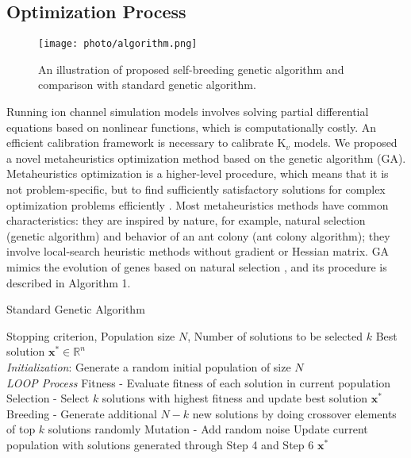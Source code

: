 \documentclass[journal]{IEEEtran}
\begin{document}
\subsection{Optimization Process}
\begin{figure}
    \label{fig5}
    \centering
    \texttt{[image: photo/algorithm.png]}
    \caption{An illustration of proposed self-breeding genetic algorithm and comparison with standard genetic algorithm.}
\end{figure}
Running ion channel simulation models involves solving partial differential equations based on nonlinear functions, which is computationally costly. An efficient calibration framework is necessary to calibrate $\text{K}_{v}$ models. We proposed a novel metaheuristics optimization method based on the genetic algorithm (GA). Metaheuristics optimization is a higher-level procedure, which means that it is not problem-specific, but to find sufficiently satisfactory solutions for complex optimization problems efficiently \cite{boussaid2013survey}. Most metaheuristics methods have common characteristics: they are inspired by nature, for example, natural selection (genetic algorithm) and behavior of an ant colony (ant colony algorithm); they involve local-search heuristic methods without gradient or Hessian matrix. GA mimics the evolution of genes based on natural selection \cite{holland1992adaptation}, and its procedure is described in Algorithm 1.
\begin{algorithm}
    \caption{Standard Genetic Algorithm}
    \begin{algorithmic}[1]
        \renewcommand{\algorithmicrequire}{\textbf{Input:}}
        \renewcommand{\algorithmicensure}{\textbf{Output:}}
        \REQUIRE Stopping criterion, Population size $N$, Number of solutions to be selected $k$
        \ENSURE Best solution $\mathbf{x^*} \in \mathbb{R}^n$
        \\ \textit{Initialization}:
        \STATE Generate a random initial population of size $N$
        \\ \textit{LOOP Process}
        \STATE Fitness - Evaluate fitness of each solution in current population
        \STATE Selection - Select $k$ solutions with highest fitness and update best solution $\mathbf{x^{*}}$
        \STATE Breeding - Generate additional $N-k$ new solutions by doing crossover elements of top $k$ solutions randomly
        \STATE Mutation - Add random noise 
        \STATE Update current population with solutions generated through Step 4 and Step 6
        \ENDWHILE
        \RETURN $\mathbf{x^{*}}$ 
    \end{algorithmic} 
\end{algorithm}
\end{document}

